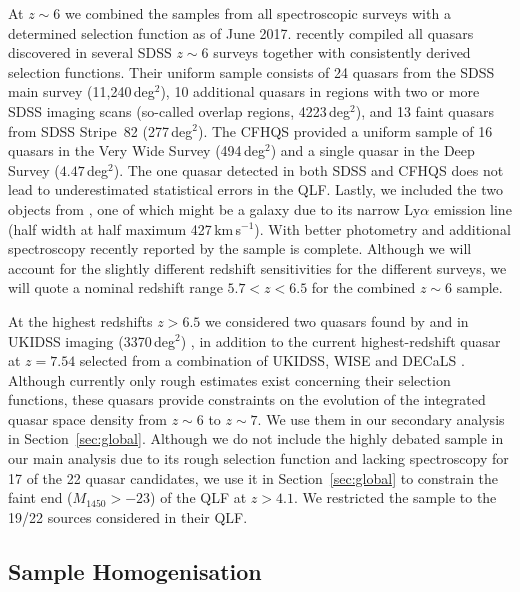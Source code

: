 \documentclass[fleqn,usenatbib]{mnras}
\begin{document}
At $z\sim 6$ we combined the samples from all spectroscopic surveys
with a determined selection function as of June 2017.
\citet{2016ApJ...833..222J} recently compiled all quasars discovered
in several SDSS $z\sim 6$ surveys together with consistently derived
selection functions. Their uniform sample consists of 24 quasars from
the SDSS main survey (11,240\,deg$^2$), 10 additional quasars in
regions with two or more SDSS imaging scans (so-called overlap
regions, 4223\,deg$^2$), and 13 faint quasars from SDSS Stripe~82
(277\,deg$^2$). The CFHQS \citep{2010AJ....139..906W} provided a
uniform sample of 16 quasars in the Very Wide Survey (494\,deg$^2$)
and a single quasar in the Deep Survey ($4.47$\,deg$^2$). The one
quasar detected in both SDSS and CFHQS does not lead to underestimated
statistical errors in the QLF. Lastly, we included the two objects
from \citet{2015ApJ...798...28K}, one of which might be a galaxy due
to its narrow Ly$\alpha$ emission line (half width at half maximum
427\,km\,s$^{-1}$). With better photometry and additional spectroscopy
recently reported by \citet{2017ApJ...847L..15O} the
\citet{2015ApJ...798...28K} sample is complete.  Although we will
account for the slightly different redshift sensitivities for the
different surveys, we will quote a nominal redshift range $5.7<z<6.5$
for the combined $z\sim 6$ sample.

At the highest redshifts $z>6.5$ we considered two quasars found by
\citet{2011Natur.474..616M} and \citet{2015ApJ...801L..11V} in UKIDSS
imaging (3370\,deg$^2$)
, in addition to the current highest-redshift
quasar at $z=7.54$ selected from a combination of UKIDSS, WISE and
DECaLS \citep[$\sim 2500$\,deg$^2$, ][]{2018Natur.553..473B}. Although
currently only rough estimates exist concerning their selection
functions, these quasars provide constraints on the evolution of the
integrated quasar space density from $z\sim 6$ to $z\sim 7$.  We use
them in our secondary analysis in Section~\ref{sec:global}.  Although
we do not include the highly debated \citet{2015AA...578A..83G} sample
in our main analysis due to its rough selection function and lacking
spectroscopy for 17 of the 22 quasar candidates, we use it in
Section~\ref{sec:global} to constrain the faint end ($M_{1450}>-23$)
of the QLF at $z>4.1$. We restricted the \citet{2015AA...578A..83G}
sample to the 19/22 sources considered in their QLF.

\subsection{Sample Homogenisation}
\label{sect:datahom}
\end{document}
